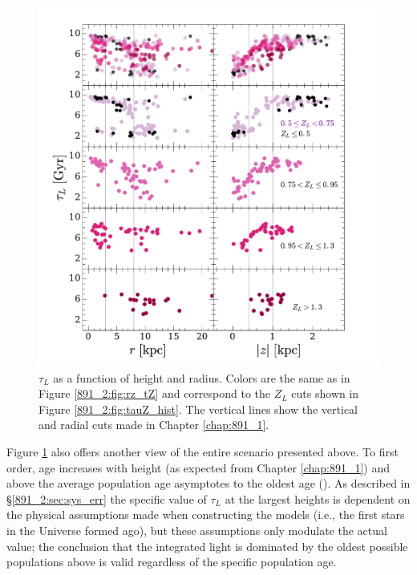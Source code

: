 \begin{figure}
  \centering
  \includegraphics[width=\textwidth]{891_2/figs/MLWA_rz_cut.pdf}
  \caption[$\tau_L$ as function of
    ($r,|z|$)]{\fixspacing\label{891_2:fig:MLWA_rz_cut}$\tau_L$ as a
    function of height and radius. Colors are the same as in Figure
    \ref{891_2:fig:rz_tZ} and correspond to the $Z_L$ cuts shown in
    Figure \ref{891_2:fig:tauZ_hist}. The vertical lines show the
    vertical and radial cuts made in Chapter \ref{chap:891_1}.}
\end{figure}

Figure \ref{891_2:fig:MLWA_rz_cut} also offers another view of the
entire scenario presented above. To first order, age increases with
height (as expected from Chapter \ref{chap:891_1}) and above
 the average population age asymptotes to the oldest age
(). As described in \S\ref{891_2:sec:sys_err} the
specific value of $\tau_L$ at the largest heights is dependent on the
physical assumptions made when constructing the models (i.e., the
first stars in the Universe formed  ago), but these
assumptions only modulate the actual value; the conclusion that the
integrated light is dominated by the oldest possible populations above
 is valid regardless of the specific population age.

